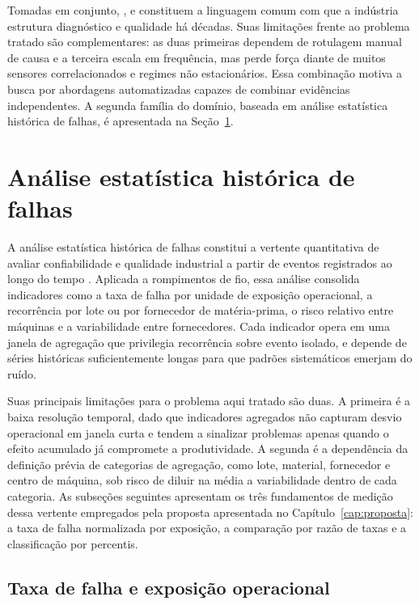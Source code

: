 Tomadas em conjunto, ,  e  constituem a linguagem comum com que a indústria estrutura diagnóstico e qualidade há décadas. Suas limitações frente ao problema tratado são complementares: as duas primeiras dependem de rotulagem manual de causa e a terceira escala em frequência, mas perde força diante de muitos sensores correlacionados e regimes não estacionários. Essa combinação motiva a busca por abordagens automatizadas capazes de combinar evidências independentes. A segunda família do domínio, baseada em análise estatística histórica de falhas, é apresentada na Seção~\ref{sec:estatistica_historica}.


\section{Análise estatística histórica de falhas}
\label{sec:estatistica_historica}

A análise estatística histórica de falhas constitui a vertente quantitativa de avaliar confiabilidade e qualidade industrial a partir de eventos registrados ao longo do tempo \cite{oconnor2012reliability}. Aplicada a rompimentos de fio, essa análise consolida indicadores como a taxa de falha por unidade de exposição operacional, a recorrência por lote ou por fornecedor de matéria-prima, o risco relativo entre máquinas e a variabilidade entre fornecedores. Cada indicador opera em uma janela de agregação que privilegia recorrência sobre evento isolado, e depende de séries históricas suficientemente longas para que padrões sistemáticos emerjam do ruído.

Suas principais limitações para o problema aqui tratado são duas. A primeira é a baixa resolução temporal, dado que indicadores agregados não capturam desvio operacional em janela curta e tendem a sinalizar problemas apenas quando o efeito acumulado já compromete a produtividade. A segunda é a dependência da definição prévia de categorias de agregação, como lote, material, fornecedor e centro de máquina, sob risco de diluir na média a variabilidade dentro de cada categoria. As subseções seguintes apresentam os três fundamentos de medição dessa vertente empregados pela proposta apresentada no Capítulo~\ref{cap:proposta}: a taxa de falha normalizada por exposição, a comparação por razão de taxas e a classificação por percentis.


\subsection{Taxa de falha e exposição operacional}
\label{subsec:metricas_exposicao}

